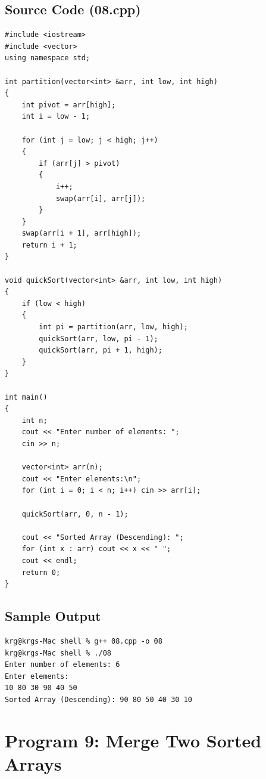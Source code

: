 \documentclass[a4paper,12pt]{article}
\begin{document}
\subsection*{Source Code (08.cpp)}
\begin{lstlisting}[style=cppstyle]
#include <iostream>
#include <vector>
using namespace std;

int partition(vector<int> &arr, int low, int high)
{
    int pivot = arr[high];
    int i = low - 1;

    for (int j = low; j < high; j++)
    {
        if (arr[j] > pivot)
        {
            i++;
            swap(arr[i], arr[j]);
        }
    }
    swap(arr[i + 1], arr[high]);
    return i + 1;
}

void quickSort(vector<int> &arr, int low, int high)
{
    if (low < high)
    {
        int pi = partition(arr, low, high);
        quickSort(arr, low, pi - 1);
        quickSort(arr, pi + 1, high);
    }
}

int main()
{
    int n;
    cout << "Enter number of elements: ";
    cin >> n;

    vector<int> arr(n);
    cout << "Enter elements:\n";
    for (int i = 0; i < n; i++) cin >> arr[i];

    quickSort(arr, 0, n - 1);

    cout << "Sorted Array (Descending): ";
    for (int x : arr) cout << x << " ";
    cout << endl;
    return 0;
}
\end{lstlisting}

\subsection*{Sample Output}
\begin{lstlisting}[style=outputstyle]
krg@krgs-Mac shell % g++ 08.cpp -o 08
krg@krgs-Mac shell % ./08
Enter number of elements: 6
Enter elements:
10 80 30 90 40 50
Sorted Array (Descending): 90 80 50 40 30 10
\end{lstlisting}

\newpage

\section*{Program 9: Merge Two Sorted Arrays}
\end{document}
